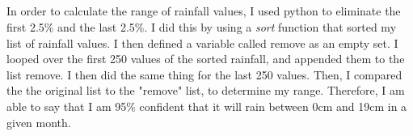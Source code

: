 \documentclass[twocolumn]{revtex4}
\begin{document}
\subsection{}
In order to calculate the range of rainfall values, I used python to eliminate the first 2.5\% and the last 2.5\%. I did this by using a {\it sort} function that sorted my list of rainfall values. I then defined a variable called remove as an empty set. I looped over the first 250 values of the sorted rainfall, and appended them to the list remove. I then did the same thing for the last 250 values. Then, I compared the the original list to the "remove" list, to determine my range. Therefore, I am able to say that I am 95\% confident that it will rain between 0cm and 19cm in a given month. 

\end{document}
